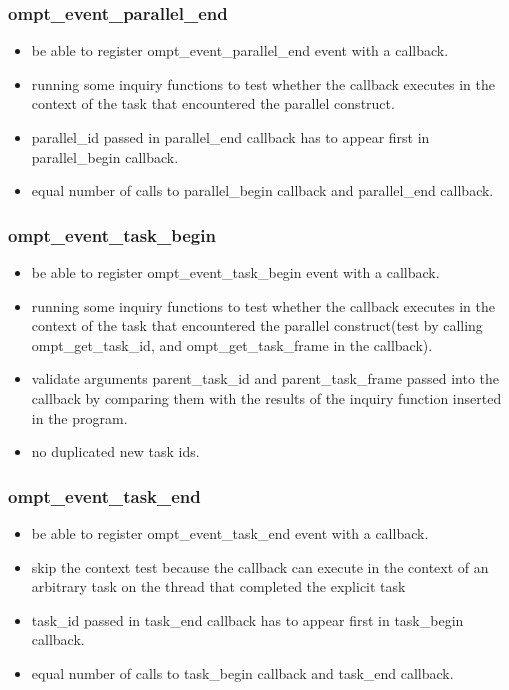 \documentclass{article}
\begin{document}
\subsubsection{ompt\_event\_parallel\_end}
    \begin{itemize}
        \item  be able to register ompt\_event\_parallel\_end event with a callback.
        \item  running some inquiry functions to test  whether the callback executes in the context of the task that encountered the parallel construct.
        \item   parallel\_id passed in parallel\_end callback has to appear first in parallel\_begin callback.
        \item   equal number of calls to parallel\_begin callback and parallel\_end callback.
    \end{itemize}


\subsubsection{ompt\_event\_task\_begin}
    \begin{itemize}
        \item  be able to register ompt\_event\_task\_begin event with a callback.
        \item  running some inquiry functions to test  whether the callback executes in the context of the task that encountered the parallel construct(test by calling ompt\_get\_task\_id, and ompt\_get\_task\_frame in the callback). 
        \item  validate arguments parent\_task\_id and parent\_task\_frame passed into the callback by comparing them with the results of the  inquiry function inserted in the program.
        \item  no duplicated new task ids.
    \end{itemize}

\subsubsection{ompt\_event\_task\_end}
    \begin{itemize}
        \item  be able to register ompt\_event\_task\_end event with a callback.
        \item  skip the context test because the callback can execute in the context of an arbitrary task on the thread that completed the explicit task 
        \item   task\_id passed in task\_end callback has to appear first in task\_begin callback.
        \item   equal number of calls to task\_begin callback and task\_end callback.
    \end{itemize}
\end{document}
